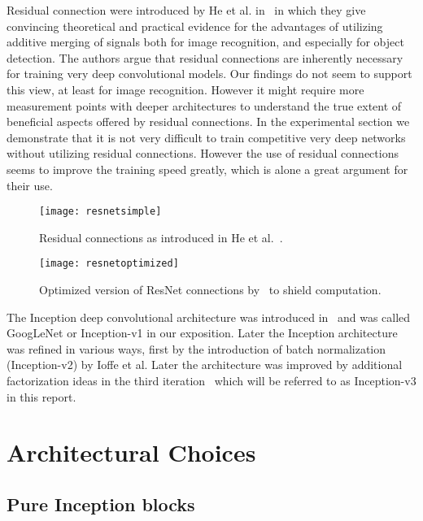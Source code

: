 \documentclass[10pt,twocolumn,letterpaper]{article}
\begin{document}
Residual connection were introduced by He et al. in~\cite{he2015deep} in
which they give convincing theoretical and practical evidence for the
advantages of utilizing additive merging of signals both for image recognition, and especially for object detection.
The authors argue that residual connections are inherently necessary for training
very deep convolutional models. Our findings do not seem to support this
view, at least for image recognition. However it might require more
measurement points with deeper architectures to understand the true extent
of beneficial aspects offered by residual connections.
In the experimental section we demonstrate that it is not very difficult to
train competitive very deep networks without utilizing residual connections.
However the use of residual connections seems to improve the training speed
greatly, which is alone a great argument for their use.
\begin{figure}
\centering
\texttt{[image: resnetsimple]}
\caption{Residual connections as introduced in He et al.~\cite{he2015deep}.}
\label{fig:resnetsimple}
\end{figure}\begin{figure}
\centering
\texttt{[image: resnetoptimized]}
\caption{Optimized version of ResNet connections by~\cite{he2015deep} to
  shield computation.}
\label{fig:resnetoptimized}
\end{figure}
The Inception deep convolutional architecture was introduced
in~\cite{szegedy2015going} and was called GoogLeNet or Inception-v1 in our
exposition.
Later the Inception architecture was refined in various ways,
first by the introduction of batch normalization
~\cite{ioffe2015batch} (Inception-v2) by Ioffe et al.
Later the architecture was improved by additional factorization ideas in the
third iteration~\cite{szegedy2015rethinking} which will be referred to as
Inception-v3 in this report.

\section{Architectural Choices}\label{arch}\subsection{Pure Inception blocks}
\end{document}
